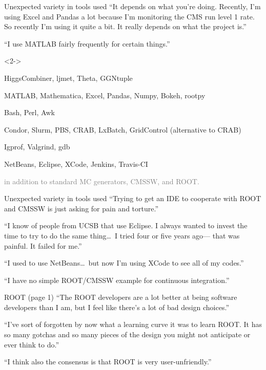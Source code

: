 \documentclass{beamer}
\begin{document}
\begin{frame}{Unexpected variety in tools used}
\vspace{0.5 cm}
\textcolor{aug29}{``It depends on what you're doing. Recently, I'm using Excel and Pandas a lot because I'm monitoring the CMS run level 1 rate. So recently I'm using it quite a bit. It really depends on what the project is.''}

\vfill
\vfill
\textcolor{aug31}{``I use MATLAB fairly frequently for certain things.''}

\vfill
\begin{uncoverenv}<2->
\begin{block}{}
\small
HiggsCombiner, ljmet, Theta, GGNtuple

MATLAB, Mathematica, Excel, Pandas, Numpy, Bokeh, rootpy

Bash, Perl, Awk

Condor, Slurm, PBS, CRAB, LxBatch, GridControl (alternative to CRAB)

Igprof, Valgrind, gdb

NetBeans, Eclipse, XCode, Jenkins, Travis-CI

\textcolor{gray}{in addition to standard MC generators, CMSSW, and ROOT.}
\end{block}
\end{uncoverenv}
\end{frame}

\begin{frame}{Unexpected variety in tools used}
\vspace{0.5 cm}
\textcolor{aug29}{``Trying to get an IDE to cooperate with ROOT and CMSSW is just asking for pain and torture.''}

\vfill
\textcolor{aug31}{``I know of people from UCSB that use Eclipse. I always wanted to invest the time to try to do the same thing\ldots\ I tried four or five years ago--- that was painful. It failed for me.''}

\vfill
\textcolor{aug31}{``I used to use NetBeans\ldots\ but now I'm using XCode to see all of my codes.''}

\vfill
\textcolor{aug29}{``I have no simple ROOT/CMSSW example for continuous integration.''}
\end{frame}

\begin{frame}{ROOT (page 1)}
\vspace{0.5 cm}
\textcolor{aug31}{``The ROOT developers are a lot better at being software developers than I am, but I feel like there's a lot of bad design choices.''}

\vfill
\textcolor{aug31}{``I've sort of forgotten by now what a learning curve it was to learn ROOT. It has so many gotchas and so many pieces of the design you might not anticipate or ever think to do.''}

\vfill
\textcolor{aug31}{``I think also the consensus is that ROOT is very user-unfriendly.''}
\end{frame}
\end{document}
